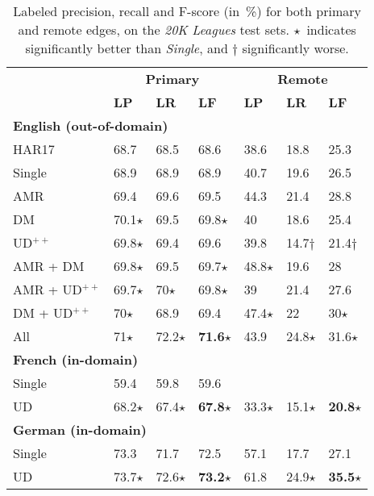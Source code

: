 \documentclass[11pt,a4paper]{article}
\begin{document}
\begin{table}[t]
\centering
\small
\setlength\tabcolsep{3pt}
\begin{tabular}{l|lll|lll}
& \multicolumn{3}{c|}{\footnotesize \bf Primary} & \multicolumn{3}{c}{\footnotesize \bf Remote} \\
& \footnotesize \textbf{LP} & \footnotesize \textbf{LR} & \footnotesize \textbf{LF}
& \footnotesize \textbf{LP} & \footnotesize \textbf{LR} & \footnotesize \textbf{LF} \\
\hline
\multicolumn{4}{l|}{\small \bf English (out-of-domain)} & \\
\footnotesize HAR17
& 68.7 & 68.5 & 68.6 & 38.6 & 18.8 & 25.3 \\
\footnotesize Single
& 68.9 & 68.9 & 68.9 & 40.7 & 19.6 & 26.5 \\
\cline{1-1}
\footnotesize AMR
& 69.4 & 69.6 & 69.5 & 44.3 & 21.4 & 28.8 \\
\footnotesize DM
& 70.1$\star$ & 69.5 & 69.8$\star$ & 40 & 18.6 & 25.4 \\
\footnotesize UD$^{++}$
& 69.8$\star$ & 69.4 & 69.6 & 39.8 & 14.7$\dagger$ & 21.4$\dagger$ \\
\footnotesize AMR + DM
& 69.8$\star$ & 69.5 & 69.7$\star$ & 48.8$\star$ & 19.6 & 28 \\
\footnotesize AMR + UD$^{++}$
& 69.7$\star$ & 70$\star$ & 69.8$\star$ & 39 & 21.4 & 27.6 \\
\footnotesize DM + UD$^{++}$
& 70$\star$ & 68.9 & 69.4 & 47.4$\star$ & 22 & 30$\star$ \\
\footnotesize All
& 71$\star$ & 72.2$\star$ & \textbf{71.6}$\star$ & 43.9 & 24.8$\star$ & 31.6$\star$ \\
\hline
\multicolumn{4}{l|}{\small \bf French (in-domain)} & \\
\small Single & 59.4 & 59.8 & 59.6 & \enskip 5.9 & \enskip 1.9 & \enskip 2.9 \\
\small UD & 68.2$\star$ & 67.4$\star$ & \textbf{67.8}$\star$ & 33.3$\star$ & 15.1$\star$ & \textbf{20.8}$\star$ \\
\hline
\multicolumn{4}{l|}{\small \bf German (in-domain)} & \\
\small Single & 73.3 & 71.7 & 72.5 & 57.1 & 17.7 & 27.1 \\
\small UD & 73.7$\star$ & 72.6$\star$ & \textbf{73.2}$\star$ & 61.8 & 24.9$\star$ & \textbf{35.5}$\star$
\end{tabular}
\caption{
Labeled precision, recall and F-score (in~\%) for both primary and remote edges,
on the \textit{20K Leagues} test sets.
$\star$~indicates significantly better than \textit{Single},
and $\dagger$ significantly worse.
}
\label{tab:ood_results}
\end{table}
\end{document}
